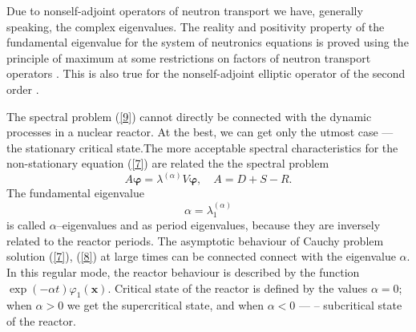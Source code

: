 \documentclass[authoryear]{elsarticle}
\begin{document}
Due to nonself-adjoint operators of neutron transport we have, generally speaking, the complex eigenvalues. The reality and positivity property of the fundamental eigenvalue for the system of neutronics equations is proved using the principle of maximum at some restrictions on factors of neutron transport operators  \cite{habetler1961existence}. 
This is also true for the nonself-adjoint elliptic operator of the second order \cite{bookEvans}. 

The spectral problem (\ref{9}) cannot directly be connected with the dynamic processes in a nuclear reactor. At the best, we can get only the utmost case --- the stationary critical state.The more acceptable spectral characteristics for the non-stationary equation (\ref{7}) are related the the spectral problem 
\begin{equation}\label{10}
 A \bm \varphi  =  \lambda^{(\alpha)} V \bm \varphi ,
 \quad A = D + S - R . 
\end{equation} 
The fundamental eigenvalue 
\[ 
 \alpha = \lambda^{(\alpha)}_1
\]
is called \cite{Bell1970}
$\alpha$--eigenvalues and as period eigenvalues,
because they are inversely related to the reactor periods.
The asymptotic behaviour of Cauchy problem solution (\ref{7}), (\ref{8}) at large times can be connected connect with the eigenvalue $\alpha$.
In this regular mode, the reactor behaviour is described by the function $\exp(-\alpha t) \varphi_1(\bm x)$.
Critical state of the reactor is defined by the values $\alpha = 0$; when $\alpha > 0$ we get the supercritical state, and when $\alpha <  0$ --- – subcritical state of the reactor.
\end{document}
